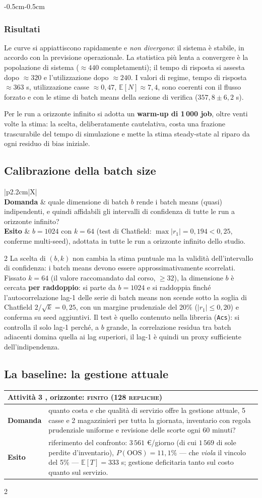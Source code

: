 \documentclass{article}
\newcommand{\schedaattivita}[4]{%
\noindent
{\renewcommand{\arraystretch}{1.25}%
\begin{tabularx}{\linewidth}{|p{2.2cm}|X|}
\hline
\multicolumn{2}{|l|}{\textbf{Attività #1} \;,  \; orizzonte: \textbf{\textsc{#2}}} \\
\hline
\textbf{Domanda} & #3 \\
\hline
\textbf{Esito} & #4 \\
\hline
\end{tabularx}}\par\vspace{6pt}}
\begin{document}
\begin{adjustwidth}{-0.5cm}{-0.5cm}
\subsubsection*{Risultati}
Le curve si appiattiscono rapidamente e \emph{non divergono}: il sistema è stabile, in accordo con
la previsione operazionale. La statistica più lenta a convergere è la popolazione di sistema
($\approx 440$ completamenti); il tempo di risposta si assesta dopo $\approx 320$ e
l'utilizzazione dopo $\approx 240$. I valori di regime,  tempo di risposta $\approx 363$ s,
utilizzazione casse $\approx 0{,}47$, $\mathbb{E}[N] \approx 7{,}4$,  sono coerenti con il
flusso forzato e con le stime di batch means della sezione di verifica ($357{,}8 \pm 6{,}2$ s).

Per le run a orizzonte infinito si adotta un \textbf{warm-up di 1\,000 job}, oltre venti volte la
stima: la scelta, deliberatamente cautelativa, costa una frazione trascurabile del tempo di
simulazione e mette la stima steady-state al riparo da ogni residuo di bias iniziale.

\subsection{Calibrazione della batch size}
\schedaattivita{2}{infinito (preparatoria)}%
{quale dimensione di batch $b$ rende i batch means (quasi) indipendenti, e quindi affidabili gli
intervalli di confidenza di tutte le run a orizzonte infinito?}%
{$b = 1024$ con $k = 64$ (test di Chatfield: $\max|r_1| = 0{,}194 < 0{,}25$, conferme
multi-seed), adottata in tutte le run a orizzonte infinito dello studio.}
\begin{multicols}{2}
La scelta di $(b,k)$ non cambia la stima puntuale ma la validità dell'intervallo di confidenza: i
batch means devono essere approssimativamente scorrelati. Fissato $k = 64$ (il valore raccomandato
dal corso, $\ge 32$), la dimensione $b$ è cercata \textbf{per raddoppio}: si parte da $b = 1024$ e
si raddoppia finché l'autocorrelazione lag-1 delle serie di batch means non scende sotto la soglia
di Chatfield $2/\sqrt{k} = 0{,}25$, con un margine prudenziale del 20\% ($|r_1| \le 0{,}20$) e
conferma su seed aggiuntivi. Il test è quello contenuto nella libreria
(\texttt{Acs}): si controlla il solo lag-1 perché, a $b$ grande, la correlazione residua tra batch
adiacenti domina quella ai lag superiori,  il lag-1 è quindi un proxy sufficiente
dell'indipendenza.
\end{multicols}
\newpage
\subsection{La baseline: la gestione attuale}
\schedaattivita{3}{finito (128 repliche)}%
{quanto costa e che qualità di servizio offre la gestione attuale, 5 casse e 2 magazzinieri per
tutta la giornata, inventario con regola prudenziale uniforme e revisione delle scorte ogni 60
minuti?}%
{riferimento del confronto: $3\,561$ \euro/giorno (di cui $1\,569$ di sole perdite d'inventario),
$P(\text{OOS}) = 11{,}1\%$ --- che \emph{viola} il vincolo del 5\% --- $\mathbb{E}[T] = 333$ s;
gestione deficitaria tanto sul costo quanto sul servizio.}
\begin{multicols}{2}

\end{multicols}
\end{adjustwidth}
\end{document}

